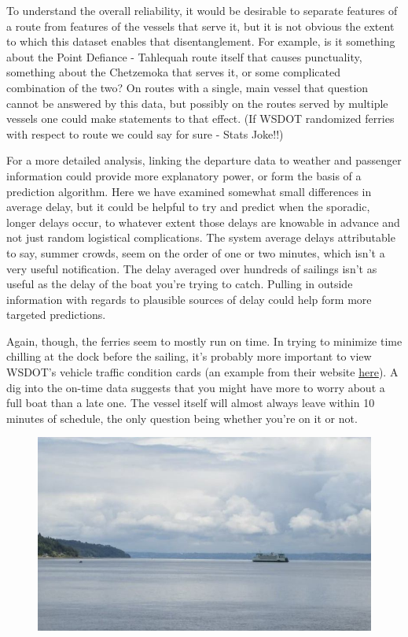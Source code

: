 \documentclass[11pt, letterpaper]{article}
\begin{document}
To understand the overall reliability, it would be desirable to separate features of a route from features of the vessels that serve it, but it is not obvious the extent to which this dataset enables that disentanglement. For example, is it something about the Point Defiance - Tahlequah route itself that causes punctuality, something about the Chetzemoka that serves it, or some complicated combination of the two? On routes with a single, main vessel that question cannot be answered by this data, but possibly on the routes served by multiple vessels one could make statements to that effect. (If WSDOT randomized ferries with respect to route we could say for sure - Stats Joke!!)

For a more detailed analysis, linking the departure data to weather and passenger information could provide more explanatory power, or form the basis of a prediction algorithm. Here we have examined somewhat small differences in average delay, but it could be helpful to try and predict when the sporadic, longer delays occur, to whatever extent those delays are knowable in advance and not just random logistical complications. The system average delays attributable to say, summer crowds, seem on the order of one or two minutes, which isn't a very useful notification. The delay averaged over hundreds of sailings isn't as useful as the delay of the boat you're trying to catch. Pulling in outside information with regards to plausible sources of delay could help form more targeted predictions.

Again, though, the ferries seem to mostly run on time. In trying to minimize time chilling at the dock before the sailing, it's probably more important to view WSDOT's vehicle traffic condition cards (an example from their website {\color{blue}\href{http://www.wsdot.wa.gov/ferries/traffic_stats/congestion/spring/SeattleBainbridgeSpring2015.pdf}{here}}). A dig into the on-time data suggests that you might have more to worry about a full boat than a late one. The vessel itself will almost always leave within 10 minutes of schedule, the only question being whether you're on it or not.




\begin{figure}
\begin{center}
\includegraphics[scale = .55]{ferry2.jpg}
\end{center}
\end{figure}
\end{document}
